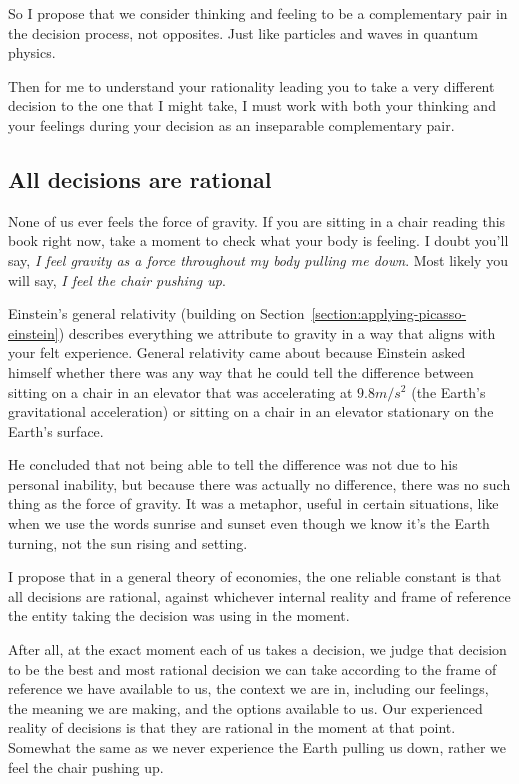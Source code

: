 So I propose that we consider thinking and feeling to be a complementary pair  in the decision process, not opposites. Just like particles and waves in quantum physics. 


Then for me to understand your rationality   leading you to take a very different decision to the one that I might take, I must work with both your thinking and your feelings during your decision as an inseparable complementary pair. 


\subsection{All decisions are rational}
None of us ever feels the force of gravity. If you are sitting in a chair reading this book right now, take a moment to check what your body is feeling. I doubt you'll say, \emph{I feel gravity as a force throughout my body pulling me down}. Most likely you will say, \emph{I feel the chair pushing up}.


Einstein's general relativity (building on Section~\ref{section:applying-picasso-einstein}) describes everything we attribute to gravity in a way that aligns with your felt experience. General relativity came about because Einstein  asked himself whether there was any way that he could tell the difference between sitting on a chair in an elevator that was accelerating at $9.8m/s^2$ (the Earth’s gravitational acceleration) or sitting on a chair in an elevator stationary on the Earth’s surface.


He concluded that not being able to tell the difference was not due to his personal inability, but because there was actually no difference, there was no such thing as the force of gravity. It was a metaphor, useful in certain situations, like when we use the words sunrise and sunset even though we know it’s the Earth turning, not the sun rising and setting.


I propose that in a general theory of economies, the one reliable constant is that all decisions are rational, against whichever internal reality and frame of reference the entity taking the decision was using in the moment.


After all, at the exact moment each of us takes a decision, we judge that decision to be the best and most rational decision we can take according to the frame of reference we have available to us, the context we are in, including our feelings, the meaning we are making, and the options available to us. Our experienced reality of decisions  is that they are rational in the moment at that point. Somewhat the same as we never experience the Earth pulling us down, rather we feel the chair pushing up.


